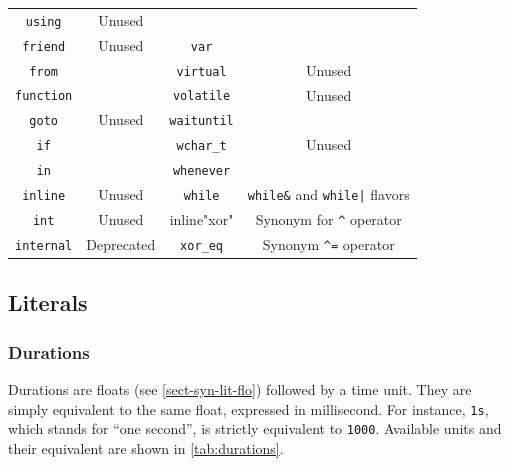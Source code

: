\documentclass[openright,twoside,12pt]{report}
\newcommand{\tab}[1]{\autoref{tab:#1}}
\begin{document}
\begin{table}[htp]
\begin{tabular}{|c|c||c|c|}
    \lstinline"using"             & Unused                                  \\
    \lstinline"friend"            & Unused                                  &
    \lstinline"var"               &                                         \\
    \lstinline"from"              &                                         &
    \lstinline"virtual"           & Unused                                  \\
    \lstinline"function"          &                                         &
    \lstinline"volatile"          & Unused                                  \\
    \lstinline"goto"              & Unused                                  &
    \lstinline"waituntil"         &                                         \\
    \lstinline"if"                &                                         &
    \lstinline"wchar_t"           & Unused                                  \\
    \lstinline"in"                &                                         &
    \lstinline"whenever"          &                                         \\
    \lstinline"inline"            & Unused                                  &
    \lstinline"while"             & \lstinline|while&| and
                                    \lstinline-while|- flavors              \\
    \lstinline"int"               & Unused                                  &
    inline"xor"                   & Synonym for \lstinline|^| operator      \\
    \lstinline"internal"          & Deprecated                              &
    \lstinline"xor_eq"            & Synonym \lstinline|^=| operator         \\
    \hline
  \end{tabular}
\end{table}
\renewcommand{\baselinestretch}{1}

\subsection{Literals}
\subsubsection{Durations}

Durations are floats (see \autoref{sect-syn-lit-flo}) followed by a
time unit. They are simply equivalent to the same float, expressed in
millisecond. For instance, \lstinline|1s|, which stands for ``one
second'', is strictly equivalent to \lstinline|1000|. Available units
and their equivalent are shown in \tab{durations}.
\end{document}
